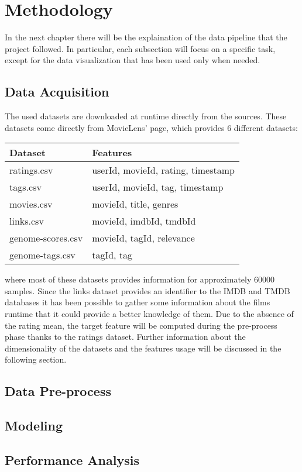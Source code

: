 \documentclass[../main]{subfiles}
\begin{document}
\chapter{Methodology}
In the next chapter there will be the explaination of the data pipeline that the project followed.
In particular, each subsection will focus on a specific task, except for the data visualization that has been used only when needed.

\section{Data Acquisition}
The used datasets are downloaded at runtime directly from the sources.
These datasets come directly from MovieLens' page, which provides 6 different datasets:

    \begin{table}[h]
        \begin{tabular}{|l | l|}
        \hline
        \textbf{Dataset} & \textbf{Features} \\
        \hline
        ratings.csv &  userId, movieId, rating, timestamp\\
        \hline
        tags.csv &  userId, movieId, tag, timestamp\\
        \hline
        movies.csv &  movieId, title, genres\\
        \hline
        links.csv &  movieId, imdbId, tmdbId\\
        \hline
        genome-scores.csv &  movieId, tagId, relevance\\
        \hline
        genome-tags.csv & tagId, tag\\
        \hline
        \end{tabular}
    \end{table}
        


where most of these datasets provides information for approximately 60000 samples.
Since the links dataset provides an identifier to the IMDB and TMDB databases it has been possible to gather some information about the films runtime that it could provide a better knowledge of them.
Due to the absence of the rating mean, the target feature will be computed during the pre-process phase thanks to the ratings dataset.
Further information about the dimensionality of the datasets and the features usage will be discussed in the following section.


\section{Data Pre-process}
\section{Modeling}
\section{Performance Analysis}
\end{document}

